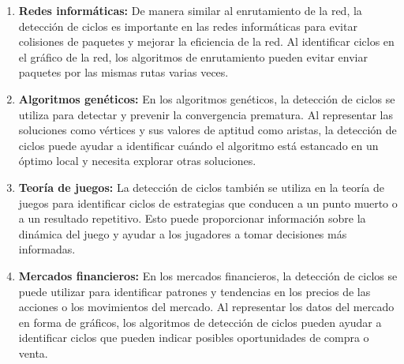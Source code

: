 \begin{enumerate}
\item \textbf{Redes informáticas:}
De manera similar al enrutamiento de la red, la detección de ciclos es importante en las redes informáticas para evitar colisiones de paquetes y mejorar la eficiencia de la red. Al identificar ciclos en el gráfico de la red, los algoritmos de enrutamiento pueden evitar enviar paquetes por las mismas rutas varias veces.

\item \textbf{Algoritmos genéticos:}
En los algoritmos genéticos, la detección de ciclos se utiliza para detectar y prevenir la convergencia prematura. Al representar las soluciones como vértices y sus valores de aptitud como aristas, la detección de ciclos puede ayudar a identificar cuándo el algoritmo está estancado en un óptimo local y necesita explorar otras soluciones.

\item \textbf{Teoría de juegos:}
La detección de ciclos también se utiliza en la teoría de juegos para identificar ciclos de estrategias que conducen a un punto muerto o a un resultado repetitivo. Esto puede proporcionar información sobre la dinámica del juego y ayudar a los jugadores a tomar decisiones más informadas.

\item \textbf{Mercados financieros:}
En los mercados financieros, la detección de ciclos se puede utilizar para identificar patrones y tendencias en los precios de las acciones o los movimientos del mercado. Al representar los datos del mercado en forma de gráficos, los algoritmos de detección de ciclos pueden ayudar a identificar ciclos que pueden indicar posibles oportunidades de compra o venta.

\end{enumerate}